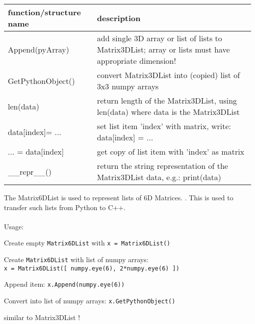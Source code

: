 \begin{center}
\footnotesize
\begin{longtable}{| p{8cm} | p{8cm} |} 
\hline
{\bf function/structure name} & {\bf description}\\ \hline
  Append(pyArray) & add single 3D array or list of lists to Matrix3DList; array or lists must have appropriate dimension!\\ \hline 
  GetPythonObject() & convert Matrix3DList into (copied) list of 3x3 numpy arrays\\ \hline 
  len(data) & return length of the Matrix3DList, using len(data) where data is the Matrix3DList\\ \hline 
  data[index]= ... & set list item 'index' with matrix, write: data[index] = ...\\ \hline 
  ... = data[index] & get copy of list item with 'index' as matrix\\ \hline 
  \_\_repr\_\_() & return the string representation of the Matrix3DList data, e.g.: print(data)\\ \hline 
\end{longtable}
\end{center}

The Matrix6DList is used to represent lists of 6D Matrices. . This is used to transfer such lists from Python to C++. \\ \\ Usage: \bi
  \item Create empty \texttt{Matrix6DList} with \texttt{x = Matrix6DList()} 
  \item Create \texttt{Matrix6DList} with list of numpy arrays:\\\texttt{x = Matrix6DList([ numpy.eye(6), 2*numpy.eye(6) ])}
  \item Append item: \texttt{x.Append(numpy.eye(6))}
  \item Convert into list of numpy arrays: \texttt{x.GetPythonObject()}
  \item similar to Matrix3DList !
\ei


